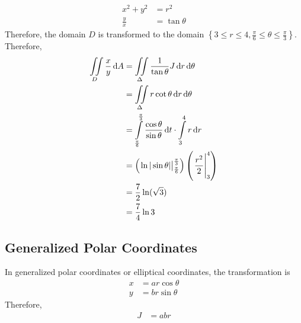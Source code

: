 \documentclass[fleqn, a4paper, 12pt, twoside]{article}
\theoremstyle{definition}
\theoremstyle{theorem}
\begin{document}
\begin{solution}
\begin{figure}[H]
	\end{figure}
	\begin{align*}
		x^2 + y^2   & = r^2 \\
		\frac{y}{x} & = \tan \theta
	\end{align*}
	Therefore, the domain $D$ is transformed to the domain $\left\{ 3 \le r \le 4 , \frac{\pi}{6} \le \theta \le \frac{\pi}{3} \right\}$.\\
	Therefore,
	\begin{align*}
		\iint\limits_{D} \frac{x}{y} \dif A & = \iint\limits_{\Delta} \frac{1}{\tan \theta} J \dif r \dif \theta                                                                    \\
                                                    & = \iint\limits_{\Delta} r \cot \theta \dif r \dif \theta                                                                              \\
                                                    & = \int\limits_{\frac{\pi}{6}}^{\frac{\pi}{3}} \frac{\cos \theta}{\sin \theta} \dif t \cdot \int\limits_{3}^{4} r \dif r               \\
                                                    & = \left( \left. \ln |\sin \theta| \right|_{\frac{\pi}{6}}^{\frac{\pi}{3}} \right) \left( \left. \frac{r^2}{2} \right|_{3}^{4} \right) \\
                                                    & = \frac{7}{2} \ln(\sqrt{3})                                                                                                           \\
                                                    & = \frac{7}{4} \ln 3
	\end{align*}
\end{solution}

\subsection{Generalized Polar Coordinates}

In generalized polar coordinates or elliptical coordinates, the transformation is
\begin{align*}
	x & = a r \cos \theta \\
	y & = b r \sin \theta
\end{align*}
Therefore,
\begin{align*}
	J & = a b r
\end{align*}
\end{document}
